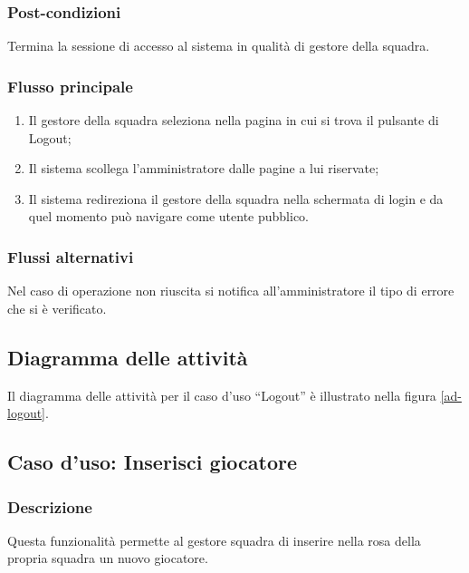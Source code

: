 \subsubsection*{Post-condizioni}
Termina la sessione di accesso al sistema in qualità di gestore della squadra.

\subsubsection*{Flusso principale}

\begin{enumerate}
	
	\item
	Il gestore della squadra seleziona nella pagina in cui si trova il pulsante di Logout;
	
	\item
	Il sistema scollega l'amministratore dalle pagine a lui riservate;
	
	\item
	Il sistema redireziona il gestore della squadra nella schermata di login e da quel momento può navigare come utente pubblico.
	
\end{enumerate}

\subsubsection*{Flussi alternativi}
Nel caso di operazione non riuscita si notifica all'amministratore il tipo di errore che si è verificato.

\subsection*{Diagramma delle attività}
Il diagramma delle attività per il caso d'uso ``Logout'' è illustrato nella figura \vref{ad-logout}.

%
%
\subsection{Caso d'uso: Inserisci giocatore}
\label{uc-inserisci-giocatore}

\subsubsection*{Descrizione}
Questa funzionalità permette al gestore squadra di inserire nella rosa della propria squadra un nuovo giocatore.

